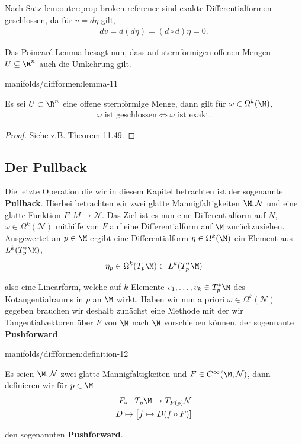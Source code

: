 \documentclass[letterpaper,10pt,german]{jupyterBook}
\begin{document}
\par
Nach Satz {lem:outer:prop broken reference} sind exakte Differentialformen geschlossen, da für \(v=d\eta\) gilt,
\begin{align*}
dv = d(d\eta) = (d\circ d)\eta = 0.
\end{align*}
\par
Das Poincaré Lemma besagt nun, dass auf sternförmigen offenen Mengen \(U\subseteq \R^n\) auch die Umkehrung gilt.
\begin{lemma}{}{manifolds/diffformen:lemma-11}



\par
Es sei \(U\subset\R^n\) eine offene sternförmige Menge, dann gilt für \(\omega\in \Omega^k(\M)\),
\begin{align*}
\omega\text{ ist geschlossen}\Leftrightarrow \omega\text{ ist exakt.}
\end{align*}\end{lemma}

\begin{proof}
 Siehe z.B. \cite{Lee03} Theorem 11.49.
\end{proof}


\subsection{Der Pullback}
\label{\detokenize{manifolds/diffformen:der-pullback}}
\par
Die letzte Operation die wir in diesem Kapitel betrachten ist der sogenannte \textbf{Pullback}. Hierbei betrachten wir zwei glatte Mannigfaltigkeiten \(\M,\mathcal{N}\) und eine glatte Funktion \(F:M\to\mathcal{N}\). Das Ziel ist es nun eine Differentialform auf \(N\), \(\omega\in\Omega^k(\mathcal{N})\) mithilfe von \(F\) auf eine Differentialform auf \(\M\) zurückzuziehen. Ausgewertet an \(p\in\M\) ergibt eine Differentialform \(\eta\in\Omega^k(\M)\) ein Element aus \(L^k(T_p^\ast\M)\),
\begin{align*}
\eta_p\in \Omega^k(T_p\M) \subset L^k(T_p^\ast\M)
\end{align*}
\par
also eine Linearform, welche auf \(k\) Elemente \(v_1,\ldots,v_k\in T_p^\ast\M\) des Kotangentialraums in \(p\) an \(\M\) wirkt. Haben wir nun a priori \(\omega\in\Omega^k(\mathcal{N})\) gegeben brauchen wir deshalb zunächst eine Methode mit der wir Tangentialvektoren über \(F\) von \(\M\) nach \(\N\) vorschieben können, der sogennante \textbf{Pushforward}.
\begin{definition}{}{manifolds/diffformen:definition-12}



\par
Es seien \(\M,\mathcal{N}\) zwei glatte Mannigfaltigkeiten und \(F\in C^\infty(\M,\mathcal{N})\), dann definieren wir für \(p\in\M\)
\begin{align*}
F_\ast:T_p\M\to T_{F(p)}\mathcal{N}\\
D\mapsto \big[f\mapsto D(f\circ F)]
\end{align*}
\par
den sogenannten \textbf{Pushforward}.
\end{definition}
\end{document}
